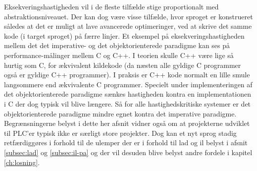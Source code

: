 \noindent Eksekveringshastigheden vil i de fleste tilfælde stige proportionalt med abstraktionsniveauet. Der kan dog være visse tilfælde, hvor sproget er konstrueret således at det er muligt at lave avancerede optimeringer, ved at skrive det samme kode (i target sproget) på færre linjer.
Et eksempel på eksekveringshastigheden mellem det det imperative- og det objektorienterede paradigme kan ses på performance-målinger mellem C og C++. I teorien skulle C++ være lige så hurtig som C, for ækvivalent kildekode (da næsten alle gyldige C programmer også er gyldige C++ programmer). I praksis er C++ kode normalt en lille smule langsommere end ækvivalente C programmer. Specielt under implementeringen af det objektorienterede paradigme sænkes hastigheden kontra en implementationen i C der dog typisk vil blive længere. Så for alle hastighedskritiske systemer er det objektorienterede paradigme mindre egnet kontra det imperative paradigme. \cite{codeprojectCPP} \cite{stackoverflowWhyCPP} \cite{linusWhyC} \cite{cVsCPPJOE}\\

\noindent Begrænsningerne belyst i dette her afsnit vidner også om at projekterne udviklet til PLC'er typisk ikke er særligt store projekter. Dog kan et nyt sprog stadig retfærdiggøres i forhold til de ulemper der er i forhold til \gls{lad} og \gls{il} belyst i afsnit \ref{subsec:lad} og \ref{subsec:il-pa} og der vil desuden blive belyst andre fordele i kapitel \ref{ch:losning}.













